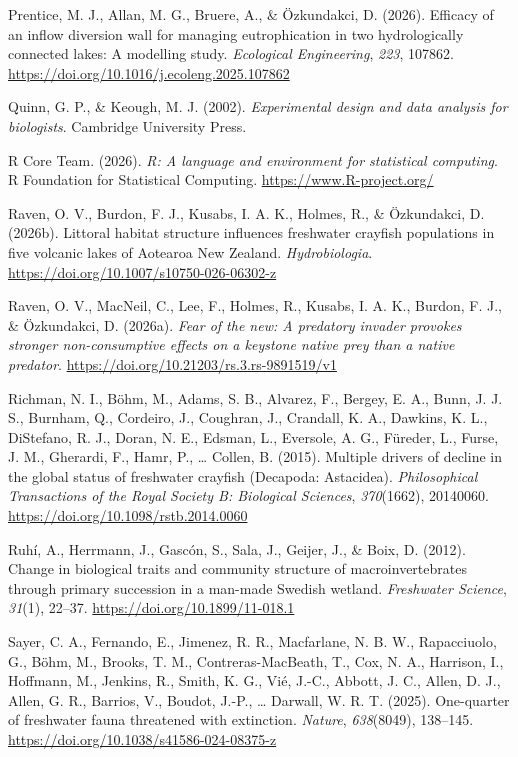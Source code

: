 \documentclass[
  letterpaper,
  DIV=11,
  numbers=noendperiod]{scrartcl}
\newlength{\cslhangindent}
\newenvironment{CSLReferences}[2] %
 {\begin{list}{}{%
  \setlength{\itemindent}{0pt}
  \setlength{\leftmargin}{0pt}
  \setlength{\parsep}{0pt}
  \ifodd #1
   \setlength{\leftmargin}{\cslhangindent}
   \setlength{\itemindent}{-1\cslhangindent}
  \fi
  \setlength{\itemsep}{#2\baselineskip}}}
 {\end{list}}
\begin{document}
\begin{CSLReferences}{1}{0}
Prentice, M. J., Allan, M. G., Bruere, A., \& Özkundakci, D. (2026).
Efficacy of an inflow diversion wall for managing eutrophication in two
hydrologically connected lakes: A modelling study. \emph{Ecological
Engineering}, \emph{223}, 107862.
\url{https://doi.org/10.1016/j.ecoleng.2025.107862}

Quinn, G. P., \& Keough, M. J. (2002). \emph{Experimental design and
data analysis for biologists}. Cambridge University Press.

R Core Team. (2026). \emph{{R}: A language and environment for
statistical computing}. R Foundation for Statistical Computing.
\url{https://www.R-project.org/}

Raven, O. V., Burdon, F. J., Kusabs, I. A. K., Holmes, R., \&
Özkundakci, D. (2026b). Littoral habitat structure influences freshwater
crayfish populations in five volcanic lakes of {Aotearoa New Zealand}.
\emph{Hydrobiologia}. \url{https://doi.org/10.1007/s10750-026-06302-z}

Raven, O. V., MacNeil, C., Lee, F., Holmes, R., Kusabs, I. A. K.,
Burdon, F. J., \& Özkundakci, D. (2026a). \emph{Fear of the new: A
predatory invader provokes stronger non-consumptive effects on a
keystone native prey than a native predator}.
\url{https://doi.org/10.21203/rs.3.rs-9891519/v1}

Richman, N. I., Böhm, M., Adams, S. B., Alvarez, F., Bergey, E. A.,
Bunn, J. J. S., Burnham, Q., Cordeiro, J., Coughran, J., Crandall, K.
A., Dawkins, K. L., DiStefano, R. J., Doran, N. E., Edsman, L.,
Eversole, A. G., Füreder, L., Furse, J. M., Gherardi, F., Hamr, P.,
\ldots{} Collen, B. (2015). Multiple drivers of decline in the global
status of freshwater crayfish ({Decapoda}: {Astacidea}).
\emph{Philosophical Transactions of the Royal Society B: Biological
Sciences}, \emph{370}(1662), 20140060.
\url{https://doi.org/10.1098/rstb.2014.0060}

Ruhí, A., Herrmann, J., Gascón, S., Sala, J., Geijer, J., \& Boix, D.
(2012). Change in biological traits and community structure of
macroinvertebrates through primary succession in a man-made {Swedish}
wetland. \emph{Freshwater Science}, \emph{31}(1), 22--37.
\url{https://doi.org/10.1899/11-018.1}

Sayer, C. A., Fernando, E., Jimenez, R. R., Macfarlane, N. B. W.,
Rapacciuolo, G., Böhm, M., Brooks, T. M., Contreras-MacBeath, T., Cox,
N. A., Harrison, I., Hoffmann, M., Jenkins, R., Smith, K. G., Vié,
J.-C., Abbott, J. C., Allen, D. J., Allen, G. R., Barrios, V., Boudot,
J.-P., \ldots{} Darwall, W. R. T. (2025). One-quarter of freshwater
fauna threatened with extinction. \emph{Nature}, \emph{638}(8049),
138--145. \url{https://doi.org/10.1038/s41586-024-08375-z}


\end{CSLReferences}
\end{document}
